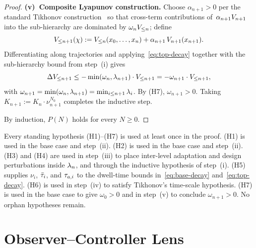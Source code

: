\documentclass[11pt,a4paper]{article}
\begin{document}
\begin{proof}
\smallskip
\noindent\textbf{(v)~Composite Lyapunov construction.}  Choose
$\alpha_{n+1} > 0$ per the standard Tikhonov construction~\cite{khalil2002nonlinear}
so that cross-term contributions of~$\alpha_{n+1}V_{n+1}$ into the
sub-hierarchy are dominated by $\omega_nV_{\leq n}$; define
\begin{equation}
  V_{\leq n+1}(\chi)
  := V_{\leq n}(x_0, \ldots, x_n)
  + \alpha_{n+1} \, V_{n+1}(x_{n+1}).
  \label{eq:composite-construction}
\end{equation}
Differentiating along trajectories and applying~\eqref{eq:top-decay}
together with the sub-hierarchy bound from step~(i) gives
\begin{equation}
  \Delta V_{\leq n+1}
  \leq -\min(\omega_n, \lambda_{n+1}) \cdot V_{\leq n+1}
  = -\omega_{n+1} \cdot V_{\leq n+1},
  \label{eq:composite-decay}
\end{equation}
with $\omega_{n+1} = \min(\omega_n, \lambda_{n+1}) = \min_{i \leq n+1}
\lambda_i$.  By (H7), $\omega_{n+1} > 0$.  Taking
$K_{n+1} := K_n \cdot \nu_{n+1}^{N_0}$ completes the inductive step.

By induction, $P(N)$ holds for every $N \geq 0$.
\end{proof}

\begin{remark}
\label{rem:orphan-check}
Every standing hypothesis (H1)--(H7) is used at least once in the
proof.  (H1) is used in the base case and step~(ii).  (H2) is used in
the base case and step~(ii).  (H3) and (H4) are used in step~(iii) to
place inter-level adaptation and design perturbations inside $\lambda_n$,
and through the inductive hypothesis of step~(i).  (H5) supplies
$\nu_i$, $\bar{\tau}_i$, and $\taua[i]$ to the dwell-time bounds
in~\eqref{eq:base-decay} and~\eqref{eq:top-decay}.  (H6) is used in
step~(iv) to satisfy Tikhonov's time-scale hypothesis.  (H7) is used
in the base case to give $\omega_0 > 0$ and in step~(v) to conclude
$\omega_{n+1} > 0$.  No orphan hypotheses remain.
\end{remark}


\section{Observer--Controller Lens}
\label{sec:self-similar}
\end{document}
